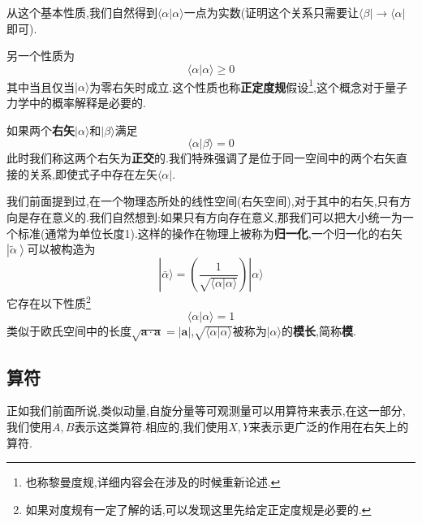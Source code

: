 从这个基本性质,我们自然得到$\langle\alpha|\alpha\rangle$一点为实数(证明这个关系只需要让$\langle\beta|\rightarrow\langle\alpha|$即可).

另一个性质为
\begin{equation}
	\langle\alpha|\alpha\rangle\geqslant0
\end{equation}
其中当且仅当$|\alpha\rangle$为零右矢时成立.这个性质也称\textbf{正定度规}假设\footnote{也称黎曼度规,详细内容会在涉及的时候重新论述.},这个概念对于量子力学中的概率解释是必要的.

如果两个\textbf{右矢}$|\alpha\rangle$和$|\beta\rangle$满足
\begin{equation}
	\langle\alpha|\beta\rangle=0
\end{equation}
此时我们称这两个右矢为\textbf{正交}的.我们特殊强调了是位于同一空间中的两个右矢直接的关系,即使式子中存在左矢$\langle\alpha|$.

我们前面提到过,在一个物理态所处的线性空间(右矢空间),对于其中的右矢,只有方向是存在意义的.我们自然想到:如果只有方向存在意义,那我们可以把大小统一为一个标准(通常为单位长度1).这样的操作在物理上被称为\textbf{归一化},一个归一化的右矢$\left|\tilde{\alpha}\right\rangle $可以被构造为
\begin{equation}
	|\bar{\alpha}\rangle=\left(\frac1{\sqrt{\langle\alpha|\alpha\rangle}}\right)|\alpha\rangle
\end{equation}
它存在以下性质\footnote{如果对度规有一定了解的话,可以发现这里先给定正定度规是必要的.}
\begin{equation}
	\langle\alpha|\alpha\rangle=1
\end{equation}
类似于欧氏空间中的长度$\sqrt{\mathbf{a}\cdot\mathbf{a}}=|\mathbf{a}|$,$\sqrt{\langle\alpha|\alpha\rangle}$被称为$|\alpha\rangle$的\textbf{模长},简称\textbf{模}.

\subsection{算符}
正如我们前面所说,类似动量,自旋分量等可观测量可以用算符来表示,在这一部分,我们使用$A,B$表示这类算符.相应的,我们使用$X,Y$来表示更广泛的作用在右矢上的算符.

